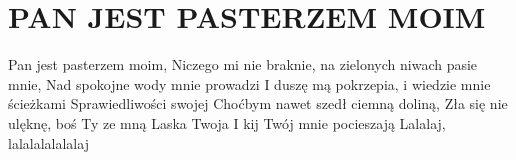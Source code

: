 \documentclass[../../../songbook.tex]{subfiles}
\begin{document}
\TabPositions{9cm} %
\section*{PAN JEST PASTERZEM MOIM}
{}
\vspace{0.5cm}
Pan jest pasterzem moim,					 \newline
Niczego mi nie braknie, na zielonych niwach pasie mnie,	 \newline
Nad spokojne wody mnie prowadzi				 \newline
I duszę mą pokrzepia, i wiedzie mnie ścieżkami		 \newline
Sprawiedliwości swojej						 \newline
Choćbym nawet szedł ciemną doliną,				 \newline
Zła się nie ulęknę, boś Ty ze mną				 \newline
Laska Twoja								 \newline
I kij Twój mnie pocieszają					 \newline
Lalalaj, lalalalalalalaj						 \newline
\end{document}
